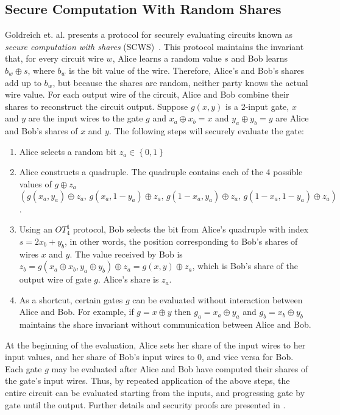 \subsection{Secure Computation With Random Shares \label{sub:SCWS}}

Goldreich et. al.  presents a protocol for securely evaluating circuits
known as \emph{secure computation with shares} (SCWS)~\cite{GMW87}. This protocol
maintains the invariant that, for every circuit wire $w$, Alice learns
a random value $s$ and Bob learns $b_{w}\oplus s$, where $b_{w}$
is the bit value of the wire. Therefore, Alice's and Bob's shares
add up to $b_{w}$, but because the shares are random, neither party
knows the actual wire value. For each output wire of the circuit,
Alice and Bob combine their shares to reconstruct the circuit output.
Suppose $g(x,y)$ is a 2-input gate, $x$ and $y$ are the input wires
to the gate $g$ and $x_{a}\oplus x_{b}=x$ and $y_{a}\oplus y_{b}=y$
are Alice and Bob's shares of $x$ and $y$. The following steps will
securely evaluate the gate: 
\begin{enumerate}
\item Alice selects a random bit $z_{a}\in\left\{ 0,1\right\} $ 
\item Alice constructs a quadruple. The quadruple contains each of the 4
possible values of $g\oplus z_{a}$\\
$\left(g(x_{a},y_{a})\oplus z_{a},\, g(x_{a},1-y_{a})\oplus z_{a},\, g(1-x_{a},y_{a})\oplus z_{a},\, g(1-x_{a},1-y_{a})\oplus z_{a}\right)$. 
\item Using an $OT_{4}^{1}$ protocol, Bob selects the bit from Alice's
quadruple with index $s=2x_{b}+y_{b}$, in other words, the position
corresponding to Bob's shares of wires $x$ and $y$. The value received
by Bob is $z_{b}=g(x_{a}\oplus x_{b},y_{a}\oplus y_{b})\oplus z_{a}=g(x,y)\oplus z_{a}$,
which is Bob's share of the output wire of gate $g$. Alice's share
is $z_{a}$.
\item As a shortcut, certain gates $g$ can be evaluated without interaction
between Alice and Bob. For example, if $g=x\oplus y$ then $g_{a}=x_{a}\oplus y_{a}$
and $g_{b}=x_{b}\oplus y_{b}$ maintains the share invariant without
communication between Alice and Bob.
\end{enumerate}
At the beginning of the evaluation, Alice sets her share of the input
wires to her input values, and her share of Bob's input wires to $0$,
and vice versa for Bob. Each gate $g$ may be evaluated after Alice
and Bob have computed their shares of the gate's input wires. Thus,
by repeated application of the above steps, the entire circuit can be evaluated
starting from the inputs, and progressing gate by gate until the output.
Further details and security proofs are presented in \cite{Goldreich:vol2}.

